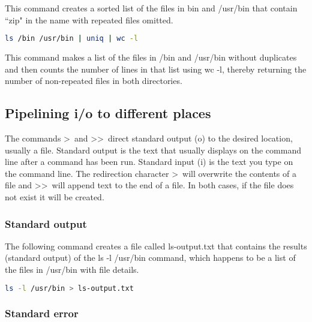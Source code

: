 \documentclass[11pt,a4paper]{article}
\begin{document}
This command creates a sorted list of the files in bin and /usr/bin that contain ``zip" in the name with repeated files  omitted.

\begin{lstlisting}[basicstyle=\ttfamily, backgroundcolor = \color{lightgray}, language = bash, xleftmargin = 0cm, framexleftmargin = 1em]
ls /bin /usr/bin | uniq | wc -l
\end{lstlisting}

This command makes a list of the files in /bin and /usr/bin without duplicates and then counts the number of lines in that list using wc -l, thereby returning the number of non-repeated files in both directories.\\

\subsection*{Pipelining i/o to different places}

\indent\indent The commands \textgreater\ and \textgreater\textgreater\ direct standard output (o) to the desired
location, usually a file. Standard output is the text that usually displays on the command line after a command has been run. Standard input (i) is the text you type on the command line. The redirection character \textgreater\ will overwrite the contents of a file and \textgreater\textgreater\ will append text to the end of a file. In both cases, if the file does not exist it will be created.

\subsubsection*{Standard output}

\indent The following command creates a file called ls-output.txt that contains the results (standard output) of the ls -l /usr/bin command, which happens to be a list of the files in /usr/bin with file details.

\begin{lstlisting}[basicstyle=\ttfamily, backgroundcolor = \color{lightgray}, language = bash, xleftmargin = 0cm, framexleftmargin = 1em]
ls -l /usr/bin > ls-output.txt
\end{lstlisting}

\subsubsection*{Standard error}
\end{document}
